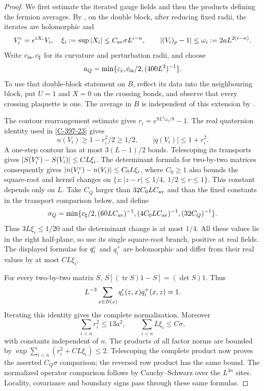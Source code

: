 \documentclass[11pt,letterpaper,reqno]{amsart}
\theoremstyle{definition}
\theoremstyle{remark}
\begin{document}
\begin{proof}
We first estimate the iterated gauge fields and then the products
defining the fermion averages. By
\cite[eq.~4.cdxxx]{YMM1}, on the double block,
after reducing fixed radii, the iterates are holomorphic and
\[
 V_i^{\rm c}=e^{iX_i}V_i,\quad
 \xi_i:=\sup|X_i|\le C_{\rm av}\sigma L^{i-n},\qquad
 |(V_i)_p-1|\le\omega_i:=2aL^{2(i-n)}.
\]
Write $c_{\rm ia},c_\sharp$ for its curvature and perturbation
radii, and choose
\[
 a_Q=\min\{\varepsilon_\flat,c_{\rm ia}/2,(400L^2)^{-1}\}.
\]
To use that double-block statement on $B$, reflect its data
into the neighbouring block, put $U=1$ and $X=0$ on the
crossing bonds, and observe that every crossing plaquette is
one. The average in $B$ is independent of this extension by
\cite[Lem.~3.41]{YMM1}.

The contour rearrangement estimate gives
$r_i=e^{9L^2\omega_i/8}-1$. The real quaternion identity
used in \cref{C-397-23} gives
\[
 n(V_i)\ge1-r_i^2/2\ge1/2,\qquad |q(V_i)|\le1+r_i^2.
\]
A one-step contour has at most $3(L-1)/2$ bonds. Telescoping
its transports gives $|S(V_i^{\rm c})-S(V_i)|\le CL\xi_i$.
The determinant formula for two-by-two matrices consequently
gives $|n(V_i^{\rm c})-n(V_i)|\le C_0L\xi_i$, where
$C_0\ge1$ also bounds the square-root and kernel changes on
$\{z:|z-r|\le1/4,\ 1/2\le r\le1\}$. This constant depends
only on $L$. Take $C_Q$ larger than $32C_0LC_{\rm av}$ and
than the fixed constants in the transport comparison below,
and define
\[
 \sigma_Q=\min\{c_\sharp/2,(60LC_{\rm av})^{-1},
                   (4C_0LC_{\rm av})^{-1},(32C_Q)^{-1}\}.
\]
Thus $3L\xi_i\le1/20$ and the determinant change is at most
$1/4$. All these values lie in the right
half-plane, so use its single square-root branch, positive
at real fields. The displayed formulas for $q_i^{\rm c}$
and $q_i^+$ are holomorphic and differ from their real
values by at most $CL\xi_i$.

For every two-by-two matrix $S$,
$S[(\operatorname{tr}S)1-S]=(\det S)1$. Thus
\[
 L^{-3}\sum_{x\in B(z)}q_i^{\rm c}(z,x)q_i^+(x,z)=1.
\]
Iterating this identity gives the complete normalization.
Moreover
\[
 \sum_{i<n}r_i^2\le13a^2,\qquad
 \sum_{i<n}L\xi_i\le C\sigma,
\]
with constants independent of $n$. The products of all
factor norms are bounded by
$\exp\sum_{i<n}(r_i^2+CL\xi_i)\le2$.
Telescoping the complete product now proves the asserted
$C_Q\sigma$ comparison; the reversed row product has the
same bound. The normalized operator comparison follows by
Cauchy--Schwarz over the $L^{3n}$ sites. Locality, covariance
and boundary signs pass through these same formulas.


\end{proof}
\end{document}
